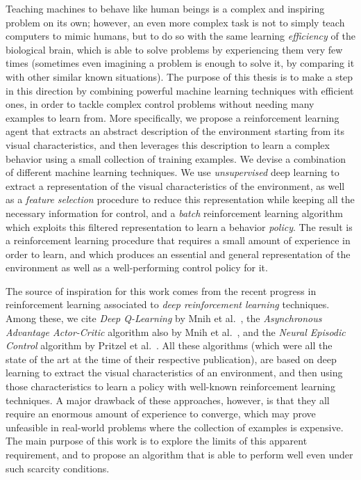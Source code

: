 Teaching machines to behave like human beings is a complex and inspiring problem
on its own; however, an even more complex task is not to simply teach computers 
to mimic humans, but to do so with the same learning \textit{efficiency} of the 
biological brain, which is able to solve problems by experiencing them very few 
times (sometimes even imagining a problem is enough to solve it, by comparing it 
with other similar known situations). 
The purpose of this thesis is to make a step in this direction by
combining powerful machine learning techniques with efficient ones, in order
to tackle complex control problems without needing many examples to learn
from.
More specifically, we propose a reinforcement learning agent that extracts an 
abstract description of the environment starting from its visual 
characteristics, and then leverages this description to learn a complex behavior
using a small collection of training examples.
We devise a combination of different machine learning techniques. We use 
\textit{unsupervised} deep learning to extract a representation of the visual 
characteristics of the environment, as well as a \textit{feature selection}
procedure to reduce this representation while keeping all the necessary 
information for control, and a \textit{batch} reinforcement learning algorithm 
which exploits this filtered representation to learn a behavior \textit{policy}.
The result is a reinforcement learning procedure that requires a small amount
of experience in order to learn, and which produces an essential and 
general representation of the environment as well as a well-performing control 
policy for it.

The source of inspiration for this work comes from the recent progress in 
reinforcement learning associated to \textit{deep reinforcement learning} 
techniques. 
Among these, we cite \textit{Deep Q-Learning} by Mnih et al.\ \cite{mnih2015human},
the \textit{Asynchronous Advantage Actor-Critic} algorithm also by Mnih et 
al.\ \cite{mnih2016asynchronous}, and the \textit{Neural Episodic Control} 
algorithm by Pritzel et al.\ \cite{pritzel2017neural}.
All these algorithms (which were all the state of the art at the time of
their respective publication), are based on deep learning to extract 
the visual characteristics of an environment, and then using those 
characteristics to learn a policy with well-known reinforcement learning 
techniques. A major drawback of these approaches, however, is that they all 
require an enormous amount of experience to converge, which may prove unfeasible
in real-world problems where the collection of examples is expensive.
The main purpose of this work is to explore the limits of this apparent 
requirement, and to propose an algorithm that is able to perform well even under 
such scarcity conditions.

